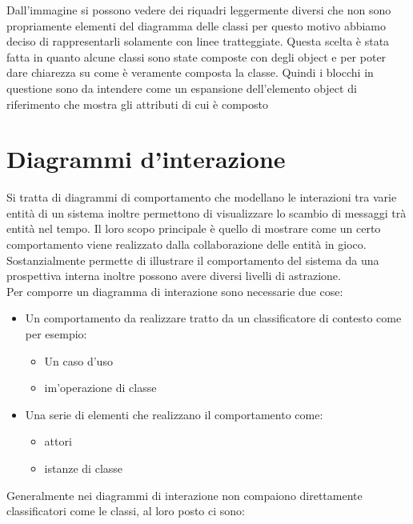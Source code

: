 \documentclass[a4paper, 11pt,oneside]{book}
\newcommand{\spacing}{\par\bigskip\noindent}
\begin{document}
    \spacing
    Dall'immagine si possono vedere dei riquadri leggermente diversi che non sono propriamente elementi del diagramma delle classi per questo motivo abbiamo deciso di rappresentarli solamente con linee tratteggiate.
    Questa scelta è stata fatta in quanto alcune classi sono state composte con degli object e per poter dare chiarezza su come è veramente composta la classe. Quindi i blocchi in questione sono da intendere come un espansione
    dell'elemento object di riferimento che mostra gli attributi di cui è composto


\chapter{Diagrammi d'interazione}
    Si tratta di diagrammi di comportamento che modellano le interazioni tra varie entità di un sistema inoltre permettono di visualizzare
    lo scambio di messaggi trà entità nel tempo. Il loro scopo principale è quello di mostrare come un certo comportamento viene realizzato dalla collaborazione
    delle entità in gioco.\\
    Sostanzialmente permette di illustrare il comportamento del sistema da una prospettiva interna inoltre possono avere diversi livelli di astrazione.\\
    Per comporre un diagramma di interazione sono necessarie due cose:
    \begin{itemize}
        \item Un comportamento da realizzare tratto da un classificatore di contesto come per esempio:
        \begin{itemize}
            \item Un caso d'uso
            \item im'operazione di classe
        \end{itemize}
        \item Una serie di elementi che realizzano il comportamento come:
        \begin{itemize}
            \item attori
            \item istanze di classe
        \end{itemize}
    \end{itemize}
    Generalmente nei diagrammi di interazione non compaiono direttamente classificatori come le classi, al loro posto ci sono:
\end{document}
